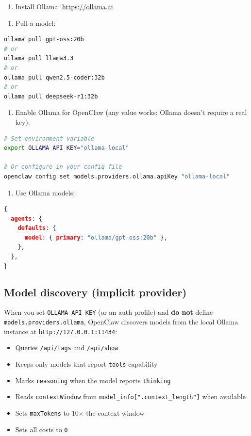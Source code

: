 \begin{enumerate}
  \item Install Ollama: \href{https://ollama.ai}{https://ollama.ai}
\end{enumerate}


\begin{enumerate}
  \item Pull a model:
\end{enumerate}


\begin{lstlisting}[language=bash]
ollama pull gpt-oss:20b
# or
ollama pull llama3.3
# or
ollama pull qwen2.5-coder:32b
# or
ollama pull deepseek-r1:32b
\end{lstlisting}


\begin{enumerate}
  \item Enable Ollama for OpenClaw (any value works; Ollama doesn't require a real key):
\end{enumerate}


\begin{lstlisting}[language=bash]
# Set environment variable
export OLLAMA_API_KEY="ollama-local"

# Or configure in your config file
openclaw config set models.providers.ollama.apiKey "ollama-local"
\end{lstlisting}


\begin{enumerate}
  \item Use Ollama models:
\end{enumerate}


\begin{lstlisting}[language=json]
{
  agents: {
    defaults: {
      model: { primary: "ollama/gpt-oss:20b" },
    },
  },
}
\end{lstlisting}


\subsection{Model discovery (implicit provider)}


When you set \texttt{OLLAMA\_API\_KEY} (or an auth profile) and \textbf{do not} define \texttt{models.providers.ollama}, OpenClaw discovers models from the local Ollama instance at \texttt{http://127.0.0.1:11434}:

\begin{itemize}
  \item Queries \texttt{/api/tags} and \texttt{/api/show}
  \item Keeps only models that report \texttt{tools} capability
  \item Marks \texttt{reasoning} when the model reports \texttt{thinking}
  \item Reads \texttt{contextWindow} from \texttt{model\_info[".context\_length"]} when available
  \item Sets \texttt{maxTokens} to 10× the context window
  \item Sets all costs to \texttt{0}
\end{itemize}


